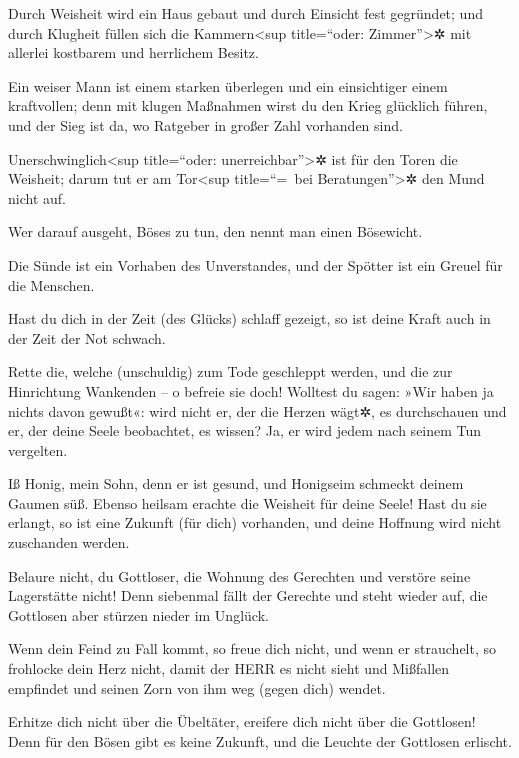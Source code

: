 Durch Weisheit wird ein Haus gebaut und durch Einsicht
fest gegründet; und durch Klugheit füllen sich die
Kammern\textless sup title=``oder: Zimmer''\textgreater✲ mit allerlei
kostbarem und herrlichem Besitz.

Ein weiser Mann ist einem starken überlegen und ein
einsichtiger einem kraftvollen; denn mit klugen Maßnahmen
wirst du den Krieg glücklich führen, und der Sieg ist da, wo Ratgeber in
großer Zahl vorhanden sind.

Unerschwinglich\textless sup title=``oder:
unerreichbar''\textgreater✲ ist für den Toren die Weisheit; darum tut er
am Tor\textless sup title=``=~bei Beratungen''\textgreater✲ den Mund
nicht auf.

Wer darauf ausgeht, Böses zu tun, den nennt man einen
Bösewicht.

Die Sünde ist ein Vorhaben des Unverstandes, und der
Spötter ist ein Greuel für die Menschen.

Hast du dich in der Zeit (des Glücks) schlaff gezeigt, so
ist deine Kraft auch in der Zeit der Not schwach.

Rette die, welche (unschuldig) zum Tode geschleppt
werden, und die zur Hinrichtung Wankenden -- o befreie sie doch!
Wolltest du sagen: »Wir haben ja nichts davon gewußt«:
wird nicht er, der die Herzen wägt✲, es durchschauen und er, der deine
Seele beobachtet, es wissen? Ja, er wird jedem nach seinem Tun
vergelten.

Iß Honig, mein Sohn, denn er ist gesund, und Honigseim
schmeckt deinem Gaumen süß. Ebenso heilsam erachte die
Weisheit für deine Seele! Hast du sie erlangt, so ist eine Zukunft (für
dich) vorhanden, und deine Hoffnung wird nicht zuschanden werden.

Belaure nicht, du Gottloser, die Wohnung des Gerechten
und verstöre seine Lagerstätte nicht! Denn siebenmal
fällt der Gerechte und steht wieder auf, die Gottlosen aber stürzen
nieder im Unglück.

Wenn dein Feind zu Fall kommt, so freue dich nicht, und
wenn er strauchelt, so frohlocke dein Herz nicht, damit
der HERR es nicht sieht und Mißfallen empfindet und seinen Zorn von ihm
weg (gegen dich) wendet.

Erhitze dich nicht über die Übeltäter, ereifere dich
nicht über die Gottlosen! Denn für den Bösen gibt es
keine Zukunft, und die Leuchte der Gottlosen erlischt.

